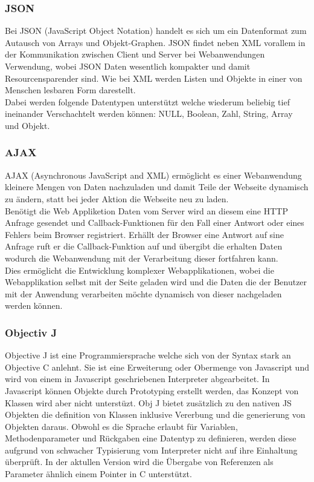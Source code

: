\subsubsection{JSON}
\label{sec:JSON}
Bei JSON (JavaScript Object Notation) handelt es sich um ein Datenformat zum Autausch von Arrays und Objekt-Graphen.
JSON findet neben XML vorallem in der Kommunikation zwischen Client und Server bei Webanwendungen Verwendung, 
wobei JSON Daten wesentlich kompakter und damit Resourcensparender sind.
Wie bei XML werden Listen und Objekte in einer von Menschen lesbaren Form darestellt.
\\
Dabei werden folgende Datentypen unterstützt welche wiederum beliebig tief ineinander Verschachtelt werden können: NULL, Boolean, Zahl, String, Array und Objekt.


\subsubsection{AJAX}
\label{sec:AJAX}
AJAX (Asynchronous JavaScript and XML) ermöglicht es einer Webanwendung kleinere Mengen von Daten nachzuladen und damit Teile der Webseite dynamisch zu ändern, 
statt bei jeder Aktion die Webseite neu zu laden.
\\
Benötigt die Web Appliketion Daten vom Server wird an diesem eine HTTP Anfrage gesendet und Callback-Funktionen für den Fall einer Antwort oder eines Fehlers beim Browser registriert.
Erhällt der Browser eine Antwort auf sine Anfrage ruft er die Callback-Funktion auf und übergibt die erhalten Daten wodurch die Webanwendung mit der Verarbeitung dieser fortfahren kann.
\\
Dies ermöglicht die Entwicklung komplexer Webapplikationen, wobei die Webapplikation selbst mit der Seite geladen wird und die Daten die der Benutzer mit der Anwendung verarbeiten möchte dynamisch von dieser nachgeladen werden können.

\subsubsection{Objectiv J}
\label{sec:Objectiv J}

Objective J ist eine Programmiersprache welche sich von der Syntax stark an Objective C anlehnt.
Sie ist eine Erweiterung oder Obermenge von Javascript und wird von einem in Javascript geschriebenen Interpreter abgearbeitet.
In Javascript können Objekte durch Prototyping erstellt werden, das Konzept von Klassen wird aber nicht unterstüzt.
Obj J bietet zusätzlich zu den nativen JS Objekten die definition von Klassen inklusive Vererbung und die generierung von Objekten daraus.
Obwohl es die Sprache erlaubt für Variablen, Methodenparameter und Rückgaben eine Datentyp zu definieren, 
werden diese aufgrund von schwacher Typisierung vom Interpreter nicht auf ihre Einhaltung überprüft.
In der aktullen Version wird die Übergabe von Referenzen als Parameter ähnlich einem Pointer in C unterstützt.
\cite{capp}

